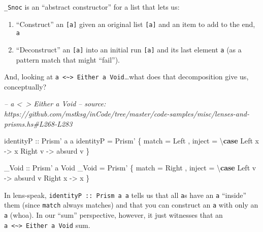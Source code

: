 \documentclass[]{article}
\newenvironment{Shaded}{}{}
\newcommand{\CommentTok}[1]{\textcolor[rgb]{0.38,0.63,0.69}{\textit{#1}}}
\newcommand{\DataTypeTok}[1]{\textcolor[rgb]{0.56,0.13,0.00}{#1}}
\newcommand{\FunctionTok}[1]{\textcolor[rgb]{0.02,0.16,0.49}{#1}}
\newcommand{\KeywordTok}[1]{\textcolor[rgb]{0.00,0.44,0.13}{\textbf{#1}}}
\newcommand{\NormalTok}[1]{#1}
\newcommand{\OtherTok}[1]{\textcolor[rgb]{0.00,0.44,0.13}{#1}}
\begin{document}
\texttt{\_Snoc} is an ``abstract constructor'' for a list that lets us:

\begin{enumerate}
\def\labelenumi{\arabic{enumi}.}
\tightlist
\item
  ``Construct'' an \texttt{{[}a{]}} given an original list \texttt{{[}a{]}} and
  an item to add to the end, \texttt{a}
\item
  ``Deconstruct'' an \texttt{{[}a{]}} into an initial run \texttt{{[}a{]}} and
  its last element \texttt{a} (as a pattern match that might ``fail'').
\end{enumerate}

And, looking at
\texttt{a\ \textless{}\textasciitilde{}\textgreater{}\ Either\ a\ Void}\ldots{}what
does that decomposition give us, conceptually?

\begin{Shaded}
\begin{Highlighting}[]
\CommentTok{-- a <~> Either a Void}
\CommentTok{-- source: https://github.com/mstksg/inCode/tree/master/code-samples/misc/lenses-and-prisms.hs#L268-L283}

\OtherTok{identityP ::} \DataTypeTok{Prism'}\NormalTok{ a a}
\NormalTok{identityP }\FunctionTok{=} \DataTypeTok{Prism'}
\NormalTok{    \{ match }\FunctionTok{=} \DataTypeTok{Left}
\NormalTok{    , inject }\FunctionTok{=}\NormalTok{ \textbackslash{}}\KeywordTok{case}
        \DataTypeTok{Left}\NormalTok{  x }\OtherTok{->}\NormalTok{ x}
        \DataTypeTok{Right}\NormalTok{ v }\OtherTok{->}\NormalTok{ absurd v}
\NormalTok{    \}}

\OtherTok{_Void ::} \DataTypeTok{Prism'}\NormalTok{ a }\DataTypeTok{Void}
\NormalTok{_Void }\FunctionTok{=} \DataTypeTok{Prism'}
\NormalTok{    \{ match }\FunctionTok{=} \DataTypeTok{Right}
\NormalTok{    , inject }\FunctionTok{=}\NormalTok{ \textbackslash{}}\KeywordTok{case}
        \DataTypeTok{Left}\NormalTok{  v }\OtherTok{->}\NormalTok{ absurd v}
        \DataTypeTok{Right}\NormalTok{ x }\OtherTok{->}\NormalTok{ x}
\NormalTok{    \}}
\end{Highlighting}
\end{Shaded}

In lens-speak, \texttt{identityP\ ::\ Prism\textquotesingle{}\ a\ a} tells us
that all \texttt{a}s have an \texttt{a} ``inside'' them (since \texttt{match}
always matches) and that you can construct an \texttt{a} with only an \texttt{a}
(whoa). In our ``sum'' perspective, however, it just witnesses that an
\texttt{a\ \textless{}\textasciitilde{}\textgreater{}\ Either\ a\ Void} sum.
\end{document}
